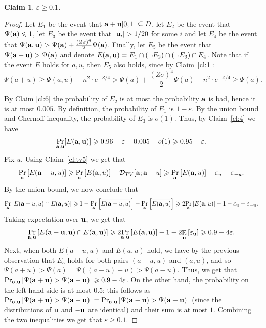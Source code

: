 \documentclass[10pt,a4paper]{article}
\newtheorem{claim}[thm]{Claim}
\newcommand\Prob[2]{{\Pr_{#1}\left[ {#2} \right]}}
\newcommand\Expect[2]{{\mathop{\mathbb{E}}_{#1}\left[ {#2} \right]}}
\newcommand\eps{\varepsilon}
\renewcommand\geq{\geqslant}
\renewcommand\leq{\leqslant}
\newcommand{\si}{\sigma}
\begin{document}
\begin{claim}
	\label{cl:5}
	$\eps\geq 0.1$.
\end{claim}
\begin{proof}
	Let $E_1$ be the event that ${\bf a} + {\bf u}[0,1]\subseteq D$, let
    $E_2$ be the event that $\Psi({\bf a})\leq 1$, let $E_3$ be the event
	that $|{\bf u}_i|>1/20$ for some $i$ and let $E_4$ be the event that
	$\Psi({\bf a},{\bf u})>\Psi({\bf a})+\frac{(Z\si)^4}{2}\Psi({\bf a})$. Finally, let $E_5$ be the event that
	$\Psi({\bf a}+{\bf u})>\Psi({\bf a})$ and denote $E({\bf a},{\bf u}) = E_1\cap (\neg E_2)\cap (\neg E_3)\cap E_4$.
    Note that if the event $E$ holds for $a,u$, then $E_5$ also holds, since by Claim~\ref{cl:1}:
	\[
	\Psi(a+u)\geq \Psi(a,u)-n^2\cdot e^{-Z/4}> \Psi(a)+\frac{(Z\si)^4}{2}\Psi(a)-n^2\cdot e^{-Z/4}\geq \Psi(a).
	\]



    By Claim \ref{cl:6} the probability of $E_2$ is at most the probability ${\bf a}$ is bad, hence it is at most $0.005$.
    By definition, the probability of $E_1$ is $1-\eps$.
    By the union bound and Chernoff inequality, the probability of $E_3$ is $o(1)$.
	Thus, by Claim~\ref{cl:4} we have
	\begin{equation}
	\Pr_{{\bf a},{\bf u}}[E({\bf a},{\bf u})]\geq 0.96 -\eps- 0.005 - o(1)\geq 0.95-\eps.
	\end{equation}
    Fix $u$. Using Claim~\ref{cl:tv5} we get that
    \[
    \Prob{{\bf a}}{E({\bf a}-u,u)} \geq
    \Prob{{\bf a}}{E({\bf a},u)} - \mathcal{D}_{TV}[{\bf a}; {\bf a}-u]
    \geq \Prob{{\bf a}}{E({\bf a},u)} - \eps_u-\eps_{-u}.
    \]
    By the union bound, we now conclude that
    \[
    \Prob{{\bf a}}{E({\bf a}-u,u)\cap E({\bf a},u)}\geq
    1 -  \Prob{{\bf a}}{\overline{E({\bf a}-u,u)}}
    -  \Prob{{\bf a}}{\overline{E({\bf a},u)}}
    \geq 2 \Prob{{\bf a}}{E({\bf a},u)} -1-\eps_u-\eps_{-u}.
    \]
    Taking expectation over ${\bf u}$, we get that
    \[
      \Prob{{\bf a},{\bf u}}{E({\bf a}-{\bf u},{\bf u})\cap E({\bf a},{\bf u})}\geq
     2\Prob{{\bf a},{\bf u}}{E({\bf a},{\bf u})} -1-2\Expect{{\bf u}}{\eps_{\bf u}}
     \geq 0.9 - 4\eps.
    \]
    Next, when both $E(a-u,u)$ and $E(a,u)$ hold, we have by the previous observation that $E_5$ holds for both pairs $(a-u,u)$ and $(a,u)$,
    and so $\Psi(a+u) > \Psi (a) = \Psi((a-u) + u) > \Psi(a-u)$. Thus, we get that
    $\Prob{{\bf a},{\bf u}}{\Psi({\bf a}+{\bf u}) > \Psi({\bf a}-{\bf u})}\geq 0.9 - 4\eps$. On the other hand, the probability on the left hand side is at most $0.5$;
    this follows as
    $\Prob{{\bf a},{\bf u}}{\Psi({\bf a}+{\bf u}) > \Psi({\bf a}-{\bf u})}
    = \Prob{{\bf a},{\bf u}}{\Psi({\bf a}-{\bf u}) > \Psi({\bf a}+{\bf u})}$ (since the distributions of ${\bf u}$ and $-{\bf u}$ are identical) and their sum is at most $1$.
    Combining the two inequalities we get that $\eps \geq 0.1$.
\end{proof}
\end{document}
